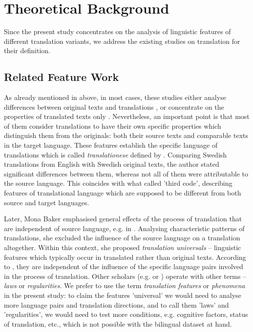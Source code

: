 \documentclass[output=paper]{LSP/langsci}
\begin{document}
\section{Theoretical Background} \label{sec:4:2}

Since the present study concentrates on the analysis of linguistic features of different translation variants, we address the existing studies on translation for their definition.

\subsection{Related Feature Work}

As already mentioned in  above, in most cases, these studies either analyse differences between original texts and translations \citep{House1997,Matthiessen2001,Teich2003,Hansen2003,Steiner2004}, or concentrate on the properties of translated texts only \citep{Baker1995}. Nevertheless, an important point is that most of them consider translations to have their own specific properties which distinguish them from the originals: both their source texts and comparable texts in the target language. These features establish the specific language of translations which is called \textit{translationese} defined by \citep{Gellerstam1986}. Comparing Swedish translations from English with Swedish original texts, the author stated signiﬁcant differences between them, whereas not all of them were attributable to the source language. This coincides with what \citet{Frawley1984} called 'third code’, describing features of translational language which are supposed to be different from both source and target languages.

Later, Mona Baker emphasised general effects of the process of translation that are independent of source language, e.g. in \citet{Baker1993,Baker1995}. Analysing characteristic patterns of translations, she excluded the influence of the source language on a translation altogether. Within this context, she proposed \textit{translation universals} – linguistic features which typically occur in translated rather than original texts. According to \citet{Baker1993}, they are independent of the influence of the specific language pairs involved in the process of translation. Other scholars (e.g. \citealt{Toury1995} or \citealt{Chesterman2004}) operate with other terms – \textit{laws} or \textit{regularities}. We prefer to use the term \textit{translation features} or \textit{phenomena} in the present study: to claim the features 'universal’ we would need to analyse more language pairs and translation directions, and to call them 'laws’ and 'regularities’, we would need to test more conditions, e.g. cognitive factors, status of translation, etc., which is not possible with the bilingual dataset at hand.
\end{document}
